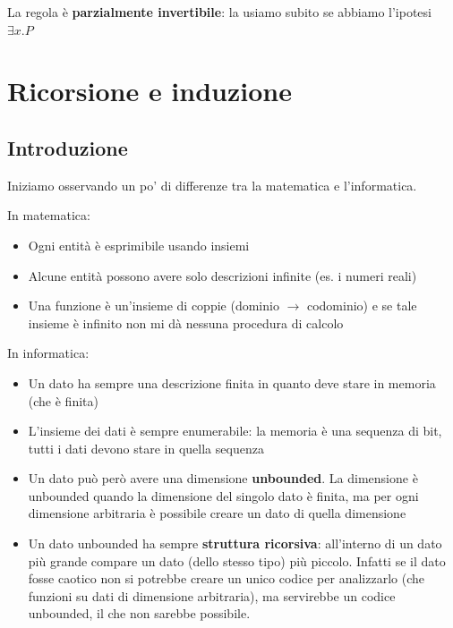 \documentclass[
  a4paper,
]{article}
\providecommand{\tightlist}{%
  \setlength{\itemsep}{0pt}\setlength{\parskip}{0pt}}
\begin{document}
La regola è \textbf{parzialmente invertibile}: la usiamo subito se
abbiamo l'ipotesi \(\exists x.P\)

\newpage

\hypertarget{ricorsione-e-induzione}{%
\section{Ricorsione e induzione}\label{ricorsione-e-induzione}}

\hypertarget{introduzione-1}{%
\subsection{Introduzione}\label{introduzione-1}}

Iniziamo osservando un po' di differenze tra la matematica e
l'informatica.

In matematica:

\begin{itemize}
\tightlist
\item
  Ogni entità è esprimibile usando insiemi
\item
  Alcune entità possono avere solo descrizioni infinite (es. i numeri
  reali)
\item
  Una funzione è un'insieme di coppie (dominio \(\to\) codominio) e se
  tale insieme è infinito non mi dà nessuna procedura di calcolo
\end{itemize}

In informatica:

\begin{itemize}
\tightlist
\item
  Un dato ha sempre una descrizione finita in quanto deve stare in
  memoria (che è finita)
\item
  L'insieme dei dati è sempre enumerabile: la memoria è una sequenza di
  bit, tutti i dati devono stare in quella sequenza
\item
  Un dato può però avere una dimensione \textbf{unbounded}. La
  dimensione è unbounded quando la dimensione del singolo dato è finita,
  ma per ogni dimensione arbitraria è possibile creare un dato di quella
  dimensione
\item
  Un dato unbounded ha sempre \textbf{struttura ricorsiva}: all'interno
  di un dato più grande compare un dato (dello stesso tipo) più piccolo.
  Infatti se il dato fosse caotico non si potrebbe creare un unico
  codice per analizzarlo (che funzioni su dati di dimensione
  arbitraria), ma servirebbe un codice unbounded, il che non sarebbe
  possibile.
\end{itemize}
\end{document}
